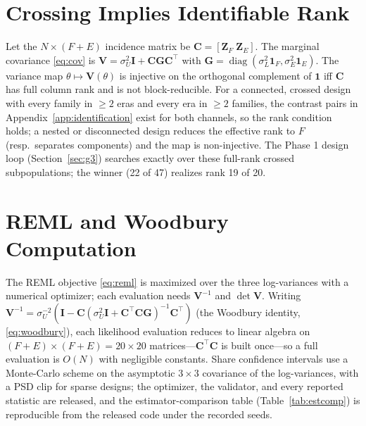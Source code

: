 \documentclass{ieeeaccess}
\theoremstyle{definition}
\theoremstyle{plain}
\begin{document}
\section{Crossing Implies Identifiable Rank}
\label{app:rank}
Let the $N\times(F+E)$ incidence matrix be
$\mathbf{C}=[\mathbf{Z}_{F}\;\mathbf{Z}_{E}]$. The marginal covariance
\eqref{eq:cov} is $\mathbf{V}=\sigma^{2}_{U}\mathbf{I}+\mathbf{C}\mathbf{G}\mathbf{C}^{\top}$
with $\mathbf{G}=\operatorname{diag}(\sigma^{2}_{L}\mathbf{1}_{F},\sigma^{2}_{E}\mathbf{1}_{E})$.
The variance map $\theta\mapsto\mathbf{V}(\theta)$ is injective on the
orthogonal complement of $\mathbf{1}$ iff $\mathbf{C}$ has full column rank and
is not block-reducible. For a connected, crossed design with every family in
$\ge2$ eras and every era in $\ge2$ families, the contrast pairs in
Appendix~\ref{app:identification} exist for both channels, so the rank condition
holds; a nested or disconnected design reduces the effective rank to
$F$ (resp.\ separates components) and the map is non-injective. The Phase 1
design loop (Section~\ref{sec:g3}) searches exactly over these full-rank
crossed subpopulations; the winner (22 of 47) realizes rank 19 of 20.

\section{REML and Woodbury Computation}
The REML objective \eqref{eq:reml} is maximized over the three log-variances with
a numerical optimizer; each evaluation needs $\mathbf{V}^{-1}$ and
$\det\mathbf{V}$. Writing
$\mathbf{V}^{-1}=\sigma_{U}^{-2}(\mathbf{I}-\mathbf{C}(\sigma^{2}_{U}\mathbf{I}
+\mathbf{C}^{\top}\mathbf{C}\mathbf{G})^{-1}\mathbf{C}^{\top})$ (the Woodbury
identity, \eqref{eq:woodbury}), each likelihood evaluation reduces to linear
algebra on $(F+E)\times(F+E)=20\times20$ matrices---$\mathbf{C}^{\top}\mathbf{C}$
is built once---so a full evaluation is $O(N)$ with negligible constants.
Share confidence intervals use a Monte-Carlo scheme on the asymptotic
$3\times3$ covariance of the log-variances, with a PSD clip for sparse designs;
the optimizer, the validator, and every reported statistic are released, and the
estimator-comparison table (Table~\ref{tab:estcomp}) is reproducible from the
released code under the recorded seeds.
\end{document}
